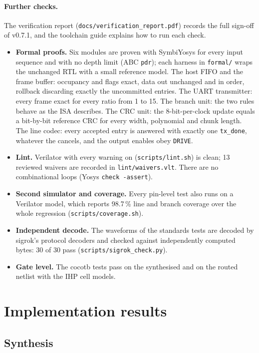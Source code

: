 \documentclass[11pt,a4paper]{article}
\newcommand{\sig}[1]{\texttt{#1}}
\begin{document}
\paragraph{Further checks.} The verification report (\sig{docs/verification\_report.pdf}) records the full sign-off of v0.7.1, and the toolchain guide explains how to run each check.
\begin{itemize}
\item \textbf{Formal proofs.} Six modules are proven with SymbiYosys for every input sequence and with no depth limit (ABC \sig{pdr}); each harness in \sig{formal/} wraps the unchanged RTL with a small reference model. The host FIFO and the frame buffer: occupancy and flags exact, data out unchanged and in order, rollback discarding exactly the uncommitted entries. The UART transmitter: every frame exact for every ratio from 1 to 15. The branch unit: the two rules behave as the ISA describes. The CRC unit: the 8-bit-per-clock update equals a bit-by-bit reference CRC for every width, polynomial and chunk length. The line codec: every accepted entry is answered with exactly one \sig{tx\_done}, whatever the cancels, and the output enables obey \sig{DRIVE}.
\item \textbf{Lint.} Verilator with every warning on (\sig{scripts/lint.sh}) is clean; 13 reviewed waivers are recorded in \sig{lint/waivers.vlt}. There are no combinational loops (Yosys \sig{check -assert}).
\item \textbf{Second simulator and coverage.} Every pin-level test also runs on a Verilator model, which reports 98.7\,\% line and branch coverage over the whole regression (\sig{scripts/coverage.sh}).
\item \textbf{Independent decode.} The waveforms of the standards tests are decoded by sigrok's protocol decoders and checked against independently computed bytes: 30 of 30 pass (\sig{scripts/\allowbreak sigrok\_check.py}).
\item \textbf{Gate level.} The cocotb tests pass on the synthesised and on the routed netlist with the IHP cell models.
\end{itemize}

\section{Implementation results}

\subsection{Synthesis}
\end{document}
